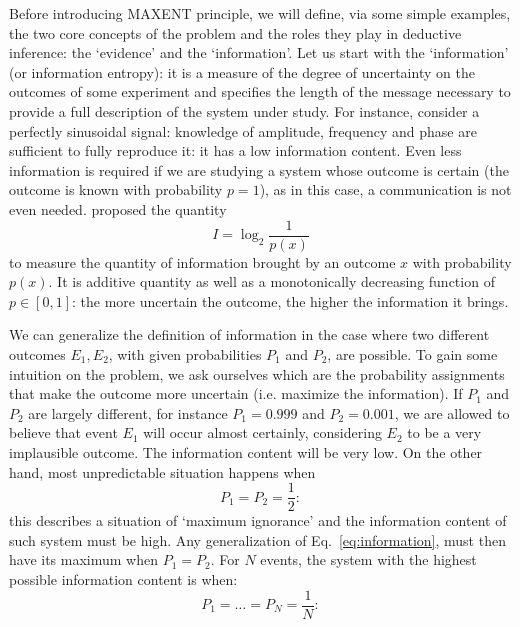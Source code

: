 \documentclass{aa}
\begin{document}
Before introducing MAXENT principle, we will define, via some simple examples, the two core concepts of the problem and the roles they play in deductive inference: the `evidence' and the `information'.
Let us start with the `information' (or information entropy): it is a measure of the degree of uncertainty on the outcomes of some experiment and specifies the length of the message necessary to provide a full description of the system under study. For instance, consider a perfectly sinusoidal signal: knowledge of amplitude, frequency and phase are sufficient to fully reproduce it: it has a low information content. Even less information is required if we are studying a system whose outcome is certain (the outcome is known with probability $p = 1$), as in this case, a communication is not even needed.  
\citet{Shannon} proposed the quantity
\begin{equation}\label{eq:information}
    I = \log_2 \frac{1}{p(x)}
\end{equation}
to measure the quantity of information brought by an outcome $x$ with probability $p(x)$. It is additive quantity as well as a monotonically decreasing function of $p \in [0, 1]$: the more uncertain the outcome, the higher the information it brings.

We can generalize the definition of information in the case where two different outcomes $E_1, E_2$, with given probabilities $P_1$ and $P_2$, are possible.
To gain some intuition on the problem, we ask ourselves which are the probability assignments that make the outcome more uncertain (i.e. maximize the information).
If $P_1$ and $P_2$ are largely different, for instance $P_1 = 0.999$ and $P_2 = 0.001$, we are allowed to believe that event $E_1$ will occur almost certainly, considering $E_2$ to be a very implausible outcome. The information content will be very low.
On the other hand, most unpredictable situation happens when 
\begin{equation}\nonumber
    P_1 = P_2 = \frac{1}{2}:
\end{equation}
this describes a situation of `maximum ignorance' and the information content of such system must be high.
Any generalization of Eq.~\eqref{eq:information}, must then have its maximum when $ P_1 = P_2$.
For $N$ events, the system with the highest possible information content is when:
\begin{equation}\nonumber
    P_1 = \hdots = P_N = \frac{1}{N}:
\end{equation}
\end{document}
